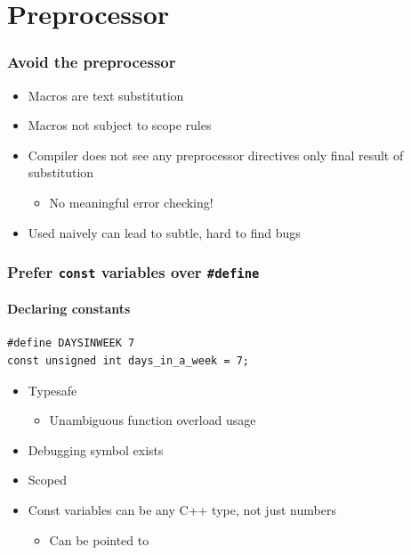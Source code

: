 \documentclass[table]{beamer}
\newcounter{rulecount}
\newcommand{\declarerule}{\textbf{\color{themeblue}{Rule \therulecount:}} }
\begin{document}

\section{Preprocessor}
\frame{\sectionpage}

\begin{frame}
    \frametitle{\declarerule Avoid the preprocessor}
    \begin{itemize}
        \item Macros are text substitution
        \item Macros not subject to scope rules
        \item Compiler does not see any preprocessor directives only final result of substitution
            \begin{itemize}
                \item No meaningful error checking!
            \end{itemize}
        \item Used naively can lead to subtle, hard to find bugs
    \end{itemize}
\end{frame}

\begin{frame}[fragile]
    \frametitle{\declarerule Prefer \texttt{const} variables over \texttt{\#define}}
    \framesubtitle{Declaring constants}
\begin{lstlisting}
#define DAYSINWEEK 7
const unsigned int days_in_a_week = 7;
\end{lstlisting}
    \begin{itemize}
        \item Typesafe
            \begin{itemize}
                \item Unambiguous function overload usage
            \end{itemize}
        \item Debugging symbol exists
        \item Scoped
        \item Const variables can be any C++ type, not just numbers
            \begin{itemize}
                \item Can be pointed to
            \end{itemize}
    \end{itemize}
\end{frame}
\end{document}
